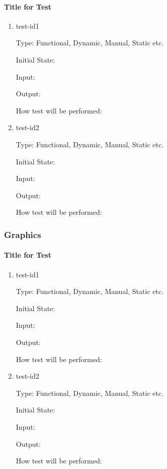 \documentclass[12pt, titlepage]{article}
\begin{document}
\paragraph{Title for Test}

\begin{enumerate}

\item{test-id1\\}

Type: Functional, Dynamic, Manual, Static etc.
					
Initial State: 
					
Input: 
					
Output: 
					
How test will be performed: 
					
\item{test-id2\\}

Type: Functional, Dynamic, Manual, Static etc.
					
Initial State: 
					
Input: 
					
Output: 
					
How test will be performed: 

\end{enumerate}

\subsubsection{Graphics}

\paragraph{Title for Test}

\begin{enumerate}

\item{test-id1\\}

Type: Functional, Dynamic, Manual, Static etc.
					
Initial State: 
					
Input: 
					
Output: 
					
How test will be performed: 
					
\item{test-id2\\}

Type: Functional, Dynamic, Manual, Static etc.
					
Initial State: 
					
Input: 
					
Output: 
					
How test will be performed: 

\end{enumerate}
\end{document}
